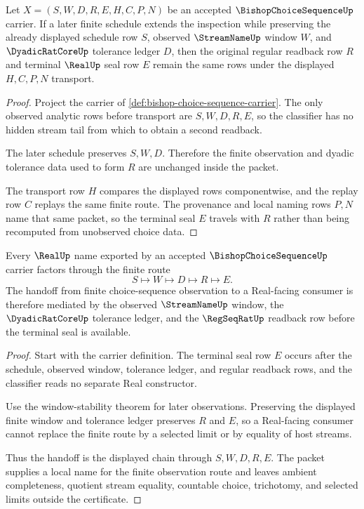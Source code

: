\begin{theorem}
\label{thm:bishop-choice-sequence-window-stability}
Let $X=(S,W,D,R,E,H,C,P,N)$ be an accepted $\BishopChoiceSequenceUp$ carrier. If a later finite schedule extends the inspection while preserving the already displayed schedule row $S$, observed $\StreamNameUp$ window $W$, and $\DyadicRatCoreUp$ tolerance ledger $D$, then the original regular readback row $R$ and terminal $\RealUp$ seal row $E$ remain the same rows under the displayed $H,C,P,N$ transport.
\end{theorem}
\begin{proof}
Project the carrier of \autoref{def:bishop-choice-sequence-carrier}. The only observed analytic rows before transport are $S,W,D,R,E$, so the classifier has no hidden stream tail from which to obtain a second readback.

The later schedule preserves $S,W,D$. Therefore the finite observation and dyadic tolerance data used to form $R$ are unchanged inside the packet.

The transport row $H$ compares the displayed rows componentwise, and the replay row $C$ replays the same finite route. The provenance and local naming rows $P,N$ name that same packet, so the terminal seal $E$ travels with $R$ rather than being recomputed from unobserved choice data.
\end{proof}

\begin{theorem}
\label{thm:bishop-choice-sequence-real-name-handoff}
Every $\RealUp$ name exported by an accepted $\BishopChoiceSequenceUp$ carrier factors through the finite route
$$
S\longmapsto W\longmapsto D\longmapsto R\longmapsto E.
$$
The handoff from finite choice-sequence observation to a Real-facing consumer is therefore mediated by the observed $\StreamNameUp$ window, the $\DyadicRatCoreUp$ tolerance ledger, and the $\RegSeqRatUp$ readback row before the terminal seal is available.
\end{theorem}
\begin{proof}
Start with the carrier definition. The terminal seal row $E$ occurs after the schedule, observed window, tolerance ledger, and regular readback rows, and the classifier reads no separate Real constructor.

Use the window-stability theorem for later observations. Preserving the displayed finite window and tolerance ledger preserves $R$ and $E$, so a Real-facing consumer cannot replace the finite route by a selected limit or by equality of host streams.

Thus the handoff is the displayed chain through $S,W,D,R,E$. The packet supplies a local name for the finite observation route and leaves ambient completeness, quotient stream equality, countable choice, trichotomy, and selected limits outside the certificate.
\end{proof}

